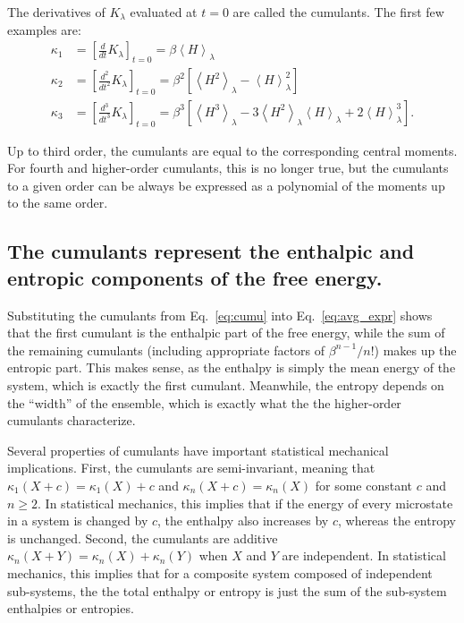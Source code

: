 \documentclass{article}
\begin{document}
The derivatives of $K_{\lambda}$ evaluated at $t=0$ are called the cumulants. The first few examples are:
\begin{align}
\kappa_1 &=
	\left[\frac{d}{dt} K_{\lambda}\right]_{t=0} =
	\beta \left\langle H \right\rangle_\lambda \nonumber\\
\kappa_2 &=
	\left[\frac{d^2}{dt^2} K_{\lambda}\right]_{t=0} =
	\beta^2 \left[
		\left\langle H^2 \right\rangle_\lambda -
    	\left\langle H \right\rangle_\lambda^2
    \right] \nonumber\\
\kappa_3 &=
	\left[\frac{d^3}{dt^3} K_{\lambda} \right]_{t=0} =
	\beta^3 \left[
		\left\langle H^3 \right\rangle_\lambda -
    	3 \left\langle H^2 \right\rangle_\lambda
    		\left\langle H \right\rangle_\lambda +
    	2 \left\langle H \right\rangle_\lambda^3
    \right].
\label{eq:cumu}
\end{align}

Up to third order, the cumulants are equal to the corresponding central moments. For fourth and higher-order cumulants, this is no longer true, but the cumulants to a given order can be always be expressed as a polynomial of the moments up to the same order.





\subsection{The cumulants represent the enthalpic and entropic components of the free energy.}

Substituting the cumulants from Eq.~\ref{eq:cumu} into Eq.~\ref{eq:avg_expr} shows that the first cumulant is the enthalpic part of the free energy, while the sum of the remaining cumulants (including appropriate factors of $\beta^{n-1}/n!$) makes up the entropic part. This makes sense, as the enthalpy is simply the mean energy of the system, which is exactly the first cumulant. Meanwhile, the entropy depends on the ``width'' of the ensemble, which is exactly what the the higher-order cumulants characterize.

Several properties of cumulants have important statistical mechanical implications. First, the cumulants are semi-invariant, meaning that $\kappa_1(X+c)=\kappa_1(X)+c$ and $\kappa_n(X+c) = \kappa_n(X)$ for some constant $c$ and $n \ge 2$. In statistical mechanics, this implies that if the energy of every microstate in a system is changed by $c$, the enthalpy also increases by $c$, whereas the entropy is unchanged. Second, the cumulants are additive $\kappa_n(X + Y) = \kappa_n(X) + \kappa_n(Y)$ when $X$ and $Y$ are independent. In statistical mechanics, this implies that for a composite system composed of independent sub-systems, the the total enthalpy or entropy is just the sum of the sub-system enthalpies or entropies.
\end{document}
